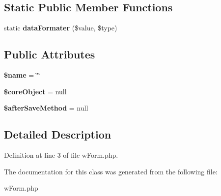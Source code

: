 \subsection*{Static Public Member Functions}
\begin{DoxyCompactItemize}
\item 
\hypertarget{classwForm_a159417635f66929192885f5f71cb2346}{
static {\bfseries dataFormater} (\$value, \$type)}
\label{classwForm_a159417635f66929192885f5f71cb2346}

\end{DoxyCompactItemize}
\subsection*{Public Attributes}
\begin{DoxyCompactItemize}
\item 
\hypertarget{classwForm_a3a25cf4996fc31fa9f55e8792548c431}{
{\bfseries \$name} = \char`\"{}\char`\"{}}
\label{classwForm_a3a25cf4996fc31fa9f55e8792548c431}

\item 
\hypertarget{classwForm_a3d5269aef844a7df3e3f3bc792b01204}{
{\bfseries \$coreObject} = null}
\label{classwForm_a3d5269aef844a7df3e3f3bc792b01204}

\item 
\hypertarget{classwForm_a9b30b0eded4585b27c7caceee6bce188}{
{\bfseries \$afterSaveMethod} = null}
\label{classwForm_a9b30b0eded4585b27c7caceee6bce188}

\end{DoxyCompactItemize}


\subsection{Detailed Description}


Definition at line 3 of file wForm.php.



The documentation for this class was generated from the following file:\begin{DoxyCompactItemize}
\item 
wForm.php\end{DoxyCompactItemize}
